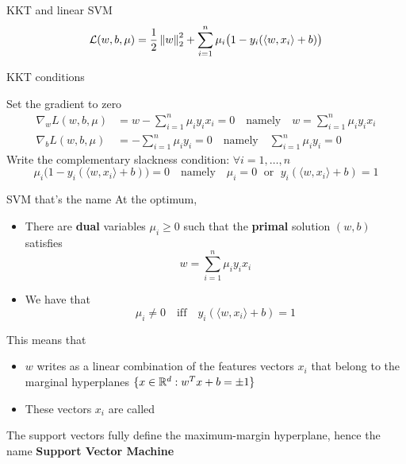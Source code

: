 \documentclass[xcolor={usenames,dvipsnames}]{beamer}
\begin{document}
\begin{frame}{KKT and linear SVM}
  \begin{equation*}
    \mathcal{L}(w, b, \mu) = \frac 12 \left\| w \right\|_2^2 + \sum_{i=1}^n \mu_i \big(1 - y_i( \langle {w, x_i} \rangle  + b) \big)
  \end{equation*}

  \begin{block}{KKT conditions}
  
    Set the gradient to zero
    \begin{align*}
      \nabla_w L(w, b, \mu) &= w - \sum_{i=1}^n \mu_i y_i x_i = 0 \quad \text{namely} \quad w = \sum_{i=1}^n \mu_i y_i x_i \\
      \nabla_b L(w, b, \mu) &= -\sum_{i=1}^n \mu_i y_i = 0 \quad \text{namely} \quad \sum_{i=1}^n \mu_i y_i =0
    \end{align*}
    Write the complementary slackness condition: $\forall i=1,\hdots,n$
    \begin{equation*}
      \mu_i \big(1 - y_i(\langle {w, x_i} \rangle + b) \big) = 0 \quad \text{namely} \quad \mu_i = 0 \; \text{ or } \; y_i(\langle {w, x_i} \rangle  + b) = 1
    \end{equation*} 
    \end{block}
\end{frame}


    



\begin{frame}{SVM that's the name}
At the optimum,
\begin{itemize}
  \item There are \textbf{dual} variables $\mu_i \geq 0$ such that the \textbf{primal} solution $(w, b)$ satisfies
\begin{equation*}
    w = \sum_{i=1}^n \mu_i y_i x_i
\end{equation*}
\item We have that
  \begin{equation*}
      \mu_i \neq 0 \quad \text{iff} \quad y_i (\langle {w, x_i} \rangle  + b) = 1
  \end{equation*}
\end{itemize}

This means that
\begin{itemize}
    \item $w$ writes as a linear combination of the features vectors $x_i$ that belong to the marginal hyperplanes $\{ x \in \mathbb{R}^d : w^T x + b = \pm 1 \}$
\item These vectors $x_i$ are called 
\end{itemize}


\medskip
The support vectors fully define the maximum-margin hyperplane, hence the name 
\textbf{\alert{Support Vector Machine}}
\end{frame}
\end{document}
